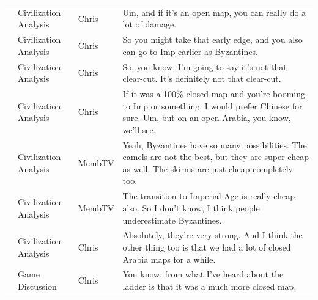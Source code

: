 {\begin{longtable}{@{}>{\theAppRow}r|L{2.3cm}L{1.0cm}U{11.55cm}@{}}
    & Civilization Analysis & Chris        & Um, and if it's an open map, you can really do a lot of damage.                                                                                                                                                                                                  \\
    & Civilization Analysis & Chris        & So you might take that early edge, and you also can go to Imp earlier as Byzantines.                                                                                                                                                                             \\
    & Civilization Analysis & Chris        & So, you know, I'm going to say it's not that clear-cut. It's definitely not that clear-cut.                                                                                                                                                                      \\
    & Civilization Analysis & Chris        & If it was a 100\% closed map and you're booming to Imp or something, I would prefer Chinese for sure. Um, but on an open Arabia, you know, we'll see.                                                                                                            \\
    & Civilization Analysis & MembTV       & Yeah, Byzantines have so many possibilities. The camels are not the best, but they are super cheap as well. The skirms are just cheap completely too.                                                                                                            \\
    & Civilization Analysis & MembTV       & The transition to Imperial Age is really cheap also. So I don't know, I think people underestimate Byzantines.                                                                                                                                                   \\
    & Civilization Analysis & Chris        & Absolutely, they're very strong. And I think the other thing too is that we had a lot of closed Arabia maps for a while.                                                                                                                                         \\
    & Game Discussion      & Chris        & You know, from what I've heard about the ladder is that it was a much more closed map.                                                                                                                                                                           \\

\end{longtable}}
